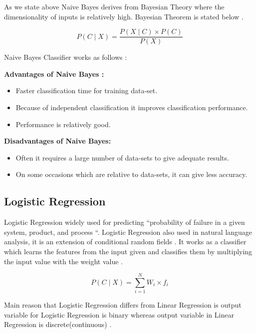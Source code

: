 \documentclass[sigconf]{acmart}
\begin{document}
\par As we state above Naive Bayes derives from Bayesian Theory where the dimensionality of inputs is relatively high. Bayesian Theorem is stated below \cite{Sayali}.

\begin{equation}
P(C \mid X) = \frac{P(X \mid C) \times P(C)} {P(X)}
\end{equation}

Naive Bayes Classifier works as follows \cite{Sayali}:

\textbf{Advantages of Naive Bayes \cite{Sayali}:}
\begin{itemize}
\item Faster classification time for training data-set.
\item Because of independent classification it improves classification performance.
\item Performance is relatively good. 
\end{itemize}

\textbf{Disadvantages of Naive Bayes\cite{Sayali}:}

\begin{itemize}
\item Often it requires a large number of data-sets to give adequate results.
\item On some occasions which are relative to data-sets, it can give less accuracy.
\end{itemize}

\subsection{Logistic Regression}

Logistic Regression widely used for predicting ``probability of failure in a given system, product, and process \cite{adarsh}``. Logistic Regression also used in natural language analysis, it is an extension of conditional random fields \cite{adarsh}. It works as a classifier which learns the features from the input given and classifies them by multiplying the input value with the weight value \cite{tweet-logistic}.

\begin{equation}
P(C \mid X) = \sum_{i=1}^{N} W_i \times f_i 
\end{equation}

\par Main reason that Logistic Regression differs from Linear Regression is output variable for Logistic Regression is binary whereas output variable in Linear Regression is discrete(continuous) \cite{fang-logistic}. 
\end{document}
